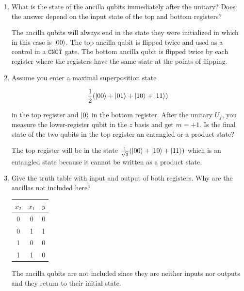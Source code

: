 \documentclass[12pt]{article}
\newcommand{\rsqrt}[1]{\ensuremath{\frac{1}{\sqrt{#1}}}}
\newenvironment{answer}{\begingroup\setlength{\leftskip}{-\leftmargin}\begin{framed}}{\end{framed}\endgroup}
\newcommand{\CNOT}[1]{\ensuremath{\texttt{CNOT}_{#1}}}
\begin{document}
\begin{enumerate}
	\item What is the state of the ancilla qubits immediately after the unitary? Does the answer depend on the input state of the top and bottom registers?

	\begin{answer}
		The ancilla qubits will always end in the state they were initialized in which in this case is $\ket{00}$. The top ancilla qubit is flipped twice and used as a control in a \CNOT{} gate. The bottom ancilla qubit is flipped twice by each register where the registers have the same state at the points of flipping.
	\end{answer}

	\item Assume you enter a maximal superposition state

	\begin{align*}
		\frac{1}{2}(\ket{00} + \ket{01} + \ket{10} + \ket{11})
	\end{align*}

	in the top register and $\ket{0}$ in the bottom register. After the unitary $U_f$, you measure the lower-register qubit in the $z$ basis and get $m = +1$. Is the final state of the two qubits in the top register an entangled or a product state?

	\begin{answer}
		The top register will be in the state $\rsqrt{3}(\ket{00} + \ket{10} + \ket{11})$ which is an entangled state because it cannot be written as a product state.
	\end{answer}

	\item Give the truth table with input and output of both registers. Why are the ancillas not included here?

	\begin{answer}
		\begin{center}
            \begin{tabular}{c c | c}
                $x_2$ & $x_1$ & $y$ \\
                \hline
                0 & 0 & 0 \\
                0 & 1 & 1 \\
                1 & 0 & 0 \\
                1 & 1 & 0 \\
            \end{tabular}
        \end{center}
		The ancilla qubits are not included since they are neither inputs nor outputs and they return to their initial state.
	\end{answer}


\end{enumerate}
\end{document}
